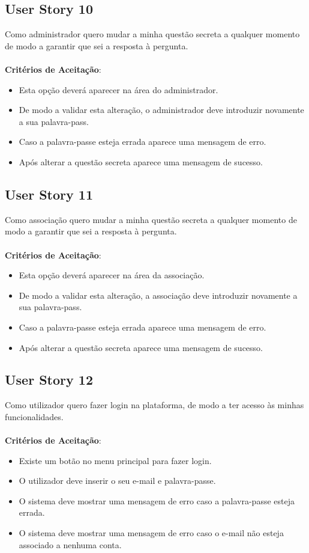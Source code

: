\documentclass[a4paper,11pt]{article}
\begin{document}
\subsection{User Story 10}
Como administrador quero mudar a minha questão secreta a qualquer momento de modo a garantir que sei a resposta à pergunta.\\\\
\textbf{Critérios de Aceitação}:
\begin{itemize}
  \item Esta opção deverá aparecer na área do administrador.
  \item De modo a validar esta alteração, o administrador deve introduzir novamente a sua palavra-pass.
  \item Caso a palavra-passe esteja errada aparece uma mensagem de erro.
  \item Após alterar a questão secreta aparece uma mensagem de sucesso.
\end{itemize}

\subsection{User Story 11}
Como associação quero mudar a minha questão secreta a qualquer momento de modo a garantir que sei a resposta à pergunta.\\\\
\textbf{Critérios de Aceitação}:
\begin{itemize}
  \item Esta opção deverá aparecer na área da associação.
  \item De modo a validar esta alteração, a associação deve introduzir novamente a sua palavra-pass.
  \item Caso a palavra-passe esteja errada aparece uma mensagem de erro.
  \item Após alterar a questão secreta aparece uma mensagem de sucesso.
\end{itemize}

\subsection{User Story 12}
Como utilizador quero fazer login na plataforma, de modo a ter acesso às minhas funcionalidades.\\\\
\textbf{Critérios de Aceitação}:
\begin{itemize}
  \item Existe um botão no menu principal para fazer login.
  \item O utilizador deve inserir o seu e-mail e palavra-passe.
  \item O sistema deve mostrar uma mensagem de erro caso a palavra-passe esteja errada.
  \item O sistema deve mostrar uma mensagem de erro caso o e-mail não esteja associado a nenhuma conta.
\end{itemize}
\end{document}
